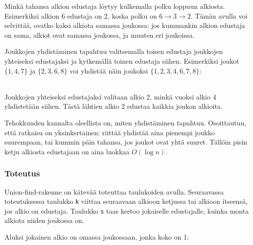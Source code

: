 Minkä tahansa alkion edustaja
löytyy kulkemalla polku loppuun alkiosta.
Esimerkiksi alkion 6 edustaja on 2,
koska polku on $6 \rightarrow 3 \rightarrow 2$.
Tämän avulla voi selvittää,
ovatko kaksi alkiota samassa joukossa:
jos kummankin alkion edustaja on sama,
alkiot ovat samassa joukossa,
ja muuten eri joukoissa.

Joukkojen yhdistäminen tapahtuu
valitsemalla toisen edustaja
joukkojen yhteiseksi edustajaksi
ja kytkemällä toinen edustaja siihen.
Esimerkiksi joukot $\{1,4,7\}$ ja $\{2,3,6,8\}$
voi yhdistää näin joukoksi $\{1,2,3,4,6,7,8\}$:
\\
\begin{center}
\end{center}
~\\
Joukkojen yhteiseksi edustajaksi valitaan alkio 2,
minkä vuoksi alkio 4 yhdistetään siihen.
Tästä lähtien alkio 2 edustaa kaikkia joukon alkioita.

Tehokkuuden kannalta oleellista on,
miten yhdistäminen tapahtuu.
Osoittautuu, että ratkaisu on yksinkertainen:
riittää yhdistää aina pienempi joukko suurempaan,
tai kummin päin tahansa,
jos joukot ovat yhtä suuret.
Tällöin pisin ketju
alkiosta edustajaan on aina luokkaa $O(\log n)$.

\subsubsection{Toteutus}

Union-find-rakenne on kätevää toteuttaa
taulukoiden avulla.
Seuraavassa toteutuksessa taulukko \texttt{k}
viittaa seuraavaan alkioon ketjussa
tai alkioon itseensä, jos alkio on edustaja.
Taulukko \texttt{s} taas kertoo jokaiselle edustajalle,
kuinka monta alkiota niiden joukossa on.

Aluksi jokainen alkio on omassa joukossaan,
jonka koko on 1:

